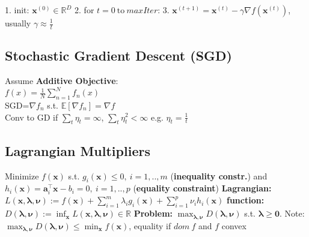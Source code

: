 1. init: $\mathbf{x}^{(0)} \in \mathbb{R}^D$ 
2. for $t = 0 \ \text{to} \ \mathit{maxIter}$: 
3. $\mathbf{x}^{(t+1)} = \mathbf{x}^{(t)} - \gamma \nabla f(\mathbf{x}^{(t)})$, usually $\gamma \approx \frac{1}{t}$

\subsection*{Stochastic Gradient Descent (SGD)}
Assume \textbf{Additive Objective}:\\
$f(x) = \frac{1}{N}\sum_{n=1}^{N}f_n(x)$\\
SGD=$\nabla f_n$ s.t. $\mathbb{E}[\nabla f_n] = \nabla f$\\
Conv to GD if $\sum_{t} \eta_t = \infty$, $\sum_{t}\eta_t^2<\infty$ e.g. $\eta_t = \frac{1}{t}$


\subsection*{Lagrangian Multipliers}
Minimize  $f(\mathbf{x})$ s.t. $g_i(\mathbf{x}) \leq 0,\ i = 1, .., m$ (\textbf{inequality constr.}) and $h_i(\mathbf{x}) = \mathbf{a}_i^\top \mathbf{x} - b_i = 0,\ i = 1, .., p$ (\textbf{equality constraint})
	\textbf{Lagrangian:} $L(\mathbf{x}, \boldsymbol{\lambda}, \boldsymbol{\nu}) := f(\mathbf{x}) + \sum_{i=1}^m \lambda_i g_i(\mathbf{x}) + \sum_{i=1}^p \nu_i h_i(\mathbf{x})$
	\textbf{function:} $D(\boldsymbol{\lambda}, \boldsymbol{\nu}) := \inf_{\mathbf{x}} L(\mathbf{x}, \boldsymbol{\lambda}, \boldsymbol{\nu}) \in \mathbb{R}$
	\textbf{Problem:} $\max_{\boldsymbol{\lambda}, \boldsymbol{\nu}} D(\boldsymbol{\lambda}, \boldsymbol{\nu})$ s.t. $\boldsymbol{\lambda} \geq \mathbf{0}$. Note: $\max_{\boldsymbol{\lambda}, \boldsymbol{\nu}} D(\boldsymbol{\lambda}, \boldsymbol{\nu}) \le \min_\mathbf{x}{f(\mathbf{x})}$, equality if $dom\ f$ and $f$ convex

